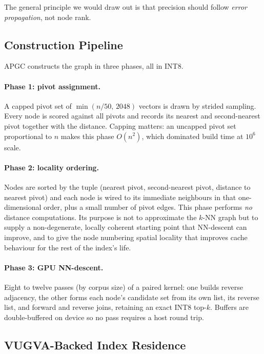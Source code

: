 \documentclass[11pt,twocolumn]{article}
\begin{document}
The general principle we would draw out is that precision should follow
\emph{error propagation}, not node rank.

\subsection{Construction Pipeline}
\label{sec:pipeline}

APGC constructs the graph in three phases, all in INT8.

\paragraph{Phase 1: pivot assignment.} A capped pivot set of
$\min(n/50,\,2048)$ vectors is drawn by strided sampling. Every node is scored
against all pivots and records its nearest and second-nearest pivot together
with the distance. Capping matters: an uncapped pivot set proportional to $n$
makes this phase $O(n^2)$, which dominated build time at $10^6$ scale.

\paragraph{Phase 2: locality ordering.} Nodes are sorted by the tuple (nearest
pivot, second-nearest pivot, distance to nearest pivot) and each node is wired
to its immediate neighbours in that one-dimensional order, plus a small number
of pivot edges. This phase performs \emph{no} distance computations. Its purpose
is not to approximate the $k$-NN graph but to supply a non-degenerate, locally
coherent starting point that NN-descent can improve, and to give the node
numbering spatial locality that improves cache behaviour for the rest of the
index's life.

\paragraph{Phase 3: GPU NN-descent.} Eight to twelve passes (by corpus size) of
a paired kernel: one builds reverse adjacency, the other forms each node's
candidate set from its own list, its reverse list, and forward and reverse
joins, retaining an exact INT8 top-$k$. Buffers are double-buffered on device so
no pass requires a host round trip.

\subsection{VUGVA-Backed Index Residence}
\label{sec:vugva}
\end{document}
